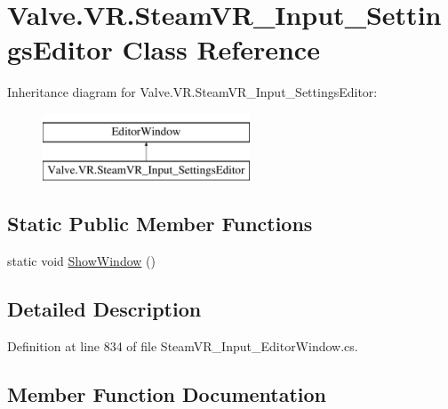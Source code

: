 \hypertarget{class_valve_1_1_v_r_1_1_steam_v_r___input___settings_editor}{}\section{Valve.\+V\+R.\+Steam\+V\+R\+\_\+\+Input\+\_\+\+Settings\+Editor Class Reference}
\label{class_valve_1_1_v_r_1_1_steam_v_r___input___settings_editor}
Inheritance diagram for Valve.\+V\+R.\+Steam\+V\+R\+\_\+\+Input\+\_\+\+Settings\+Editor\+:\begin{figure}[H]
\begin{center}
\leavevmode
\includegraphics[height=2.000000cm]{class_valve_1_1_v_r_1_1_steam_v_r___input___settings_editor}
\end{center}
\end{figure}
\subsection*{Static Public Member Functions}
\begin{DoxyCompactItemize}
\item 
static void \mbox{\hyperlink{class_valve_1_1_v_r_1_1_steam_v_r___input___settings_editor_a59ffd9b581a8fd54028f7118127a0592}{Show\+Window}} ()
\end{DoxyCompactItemize}


\subsection{Detailed Description}


Definition at line 834 of file Steam\+V\+R\+\_\+\+Input\+\_\+\+Editor\+Window.\+cs.



\subsection{Member Function Documentation}
\mbox{\label{class_valve_1_1_v_r_1_1_steam_v_r___input___settings_editor_a59ffd9b581a8fd54028f7118127a0592}} 
